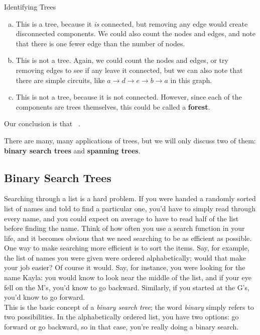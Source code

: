 \begin{example}{Identifying Trees}
\sol
\begin{enumerate}[(a)]
\item This is a tree, because it \emph{is} connected, but removing any edge would create disconnected components.  We could also count the nodes and edges, and note that there is one fewer edge than the number of nodes.
\item This is not a tree.  Again, we could count the nodes and edges, or try removing edges to see if any leave it connected, but we can also note that there are simple circuits, like $a \to d \to e \to b \to a$ in this graph.
\item This is not a tree, because it is not connected.  However, since each of the components are trees themselves, this could be called a \textbf{forest}.
\end{enumerate}

Our conclusion is that \ .
\end{example}

There are many, many applications of trees, but we will only discuss two of them: \textbf{binary search trees} and \textbf{spanning trees}.
\pagebreak

\subsection{Binary Search Trees}
Searching through a list is a hard problem.  If you were handed a randomly sorted list of names and told to find a particular one, you'd have to simply read through every name, and you could expect on average to have to read half of the list before finding the name.  Think of how often you use a search function in your life, and it becomes obvious that we need searching to be as efficient as possible.\\

One way to make searching more efficient is to sort the items.  Say, for example, the list of names you were given were ordered alphabetically; would that make your job easier?  Of course it would.  Say, for instance, you were looking for the name Kayla: you would know to look near the middle of the list, and if your eye fell on the M's, you'd know to go backward.  Similarly, if you started at the G's, you'd know to go forward.\\

This is the basic concept of a \emph{binary search tree}; the word \emph{binary} simply refers to two possibilities.  In the alphabetically ordered list, you have two options: go forward or go backward, so in that case, you're really doing a binary search.\\


